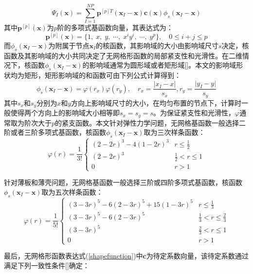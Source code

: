 \begin{equation}\label{shapefunction}
        \Psi_I(\pmb{x})=\sum_{I=1}^{N\!P}\pmb{p}^{[p]T}(\pmb{x}_I-\pmb{x})\pmb{c}(\pmb{x})\phi_s(\pmb{x}_I-\pmb{x})
\end{equation}
其中$\pmb{p}^{[p]}(\pmb{x})$为$p$阶的多项式基函数向量，其表达式为：
\begin{equation}
    \pmb{p}^{[p]}(\pmb{x})=\{1,\;x,\;y,\;\dotsb,\;x^iy^i,\;\dotsb,\;y^p\},\quad 0\le i+j \le p
\end{equation}
而$\phi_s(\pmb{x}_I-\pmb{x})$为附属于节点$\pmb{x}_I$的核函数，其影响域的大小由影响域尺寸$s$决定，核函数及其影响域的大小共同决定了无网格形函数的局部紧支性和光滑性。在二维情况下，核函数$\phi_s(\pmb{x}_I-\pmb{x})$的影响域通常为圆形域或者矩形域[]。本文的影响域形状均为矩形，矩形影响域的和函数可由下列公式计算得到：
\begin{equation}
    \phi_s(\pmb{x}_I-\pmb{x})=\varphi(r_x)\varphi(r_y),\quad r_x=\frac{\lvert x_I-x\rvert}{s_x},r_y=\frac{\lvert y_I-y \rvert}{s_y}
\end{equation}
其中$s_x$和$s_y$分别为$x$和$y$方向上影响域尺寸的大小，在均匀布置的节点下，计算时一般使得两个方向上的影响域大小相等即$s_x=s_y=s$。为保证紧支性和光滑性，$\varphi$通常取为阶次大于$p$的紧支函数。本文针对弹性力学问题，无网格基函数一般选择二阶或者三阶多项式基函数，核函数$\phi_s(\pmb{x}_I-\pmb{x})$取为三次样条函数：
\begin{equation}
    \varphi(r)=\frac{1}{3!}
\begin{cases}
    (2-2r)^3-4(1-2r)^3 &r\le \frac{1}{2}\\
    (2-2r)^3&\frac{1}{2}<r\le 1\\
    0&r>1
\end{cases}
\end{equation}\par
针对薄板和薄壳问题，无网格基函数一般选择三阶或四阶多项式基函数，核函数$\phi_s(\pmb{x}_I-\pmb{x})$取为五次样条函数：
\begin{equation}
        \varphi(r)=\frac{1}{5!}
\begin{cases}
        (3-3r)^5-6(2-3r)^5+15(1-3r)^5&r\le\frac{1}{3}\\
        (3-3r)^5-6(2-3r)^5&\frac{1}{3}<r\le\frac{2}{3}\\
        (3-3r)^5&\frac{2}{3}<r\le1\\
        0&r>1
\end{cases}
\end{equation}\par
最后，无网格形函数表达式(\ref{shapefunction})中$\pmb{c}$为待定系数向量，该待定系数通过满足下列一致性条件[]确定：
